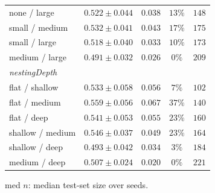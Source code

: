 \begin{table}[htbp]
\begin{tabular}{lcccc}
    none / large                & $0.522 \pm 0.044$ & $0.038$ & $13\%$ & $148$ \\
    small / medium              & $0.532 \pm 0.041$ & $0.043$ & $17\%$ & $175$ \\
    small / large               & $0.518 \pm 0.040$ & $0.033$ & $10\%$  & $173$ \\
    medium / large              & $0.491 \pm 0.032$ & $0.026$ & $0\%$  & $209$ \\
    \midrule
    \multicolumn{5}{l}{\textit{nestingDepth}} \\
    flat / shallow              & $0.533 \pm 0.058$ & $0.056$ & $7\%$  & $102$ \\
    flat / medium               & $0.559 \pm 0.056$ & $0.067$ & $37\%$ & $140$ \\
    flat / deep                 & $0.541 \pm 0.053$ & $0.055$ & $23\%$  & $160$ \\
    shallow / medium            & $0.546 \pm 0.037$ & $0.049$ & $23\%$  & $164$ \\
    shallow / deep              & $0.493 \pm 0.042$ & $0.034$ & $3\%$ & $184$ \\
    medium / deep               & $0.507 \pm 0.024$ & $0.020$ & $0\%$ & $221$ \\
    \bottomrule
  \end{tabular}
  \begin{tablenote}
    med $n$: median test-set size over seeds.
  \end{tablenote}
\end{table}

